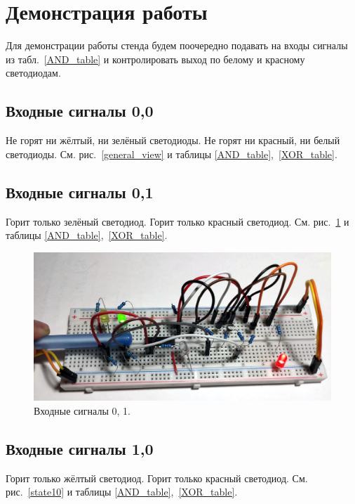 \documentclass[a4paper,12pt]{article}
\begin{document}
\section{Демонстрация работы}

Для демонстрации работы стенда будем поочередно подавать на входы сигналы из табл.~\ref{AND_table} и контролировать выход по белому и красному светодиодам.

\subsection{Входные сигналы 0,0}

Не горят ни жёлтый, ни зелёный светодиоды. Не горят ни красный, ни белый светодиоды. См. рис.~\ref{general_view} и таблицы \ref{AND_table},~\ref{XOR_table}.

\subsection{Входные сигналы 0,1}

Горит только зелёный светодиод. Горит только красный светодиод. См. рис.~\ref{state01} и таблицы \ref{AND_table},~\ref{XOR_table}.

\begin{figure}[H]
    \begin{center}
    \includegraphics[width=\textwidth]{state01}    
    \caption{Входные сигналы 0, 1.}
    \label{state01}
    \end{center}
\end{figure}

\subsection{Входные сигналы 1,0}

Горит только жёлтый светодиод. Горит только красный светодиод. См. рис.~\ref{state10} и таблицы \ref{AND_table},~\ref{XOR_table}.
\end{document}
